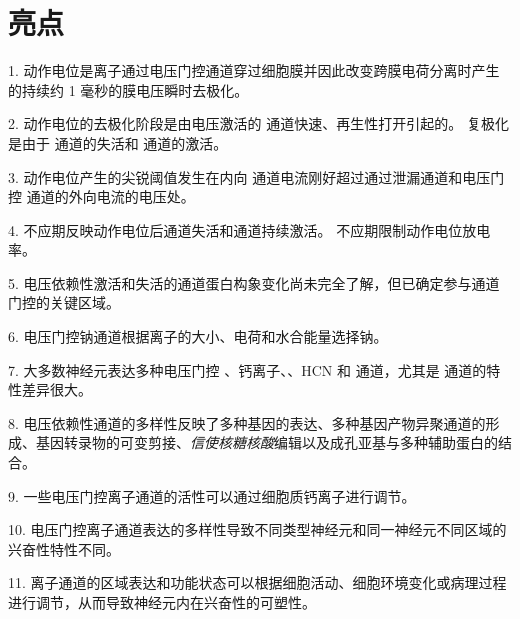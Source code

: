 \section{亮点}

1. 动作电位是离子通过电压门控通道穿过细胞膜并因此改变跨膜电荷分离时产生的持续约 1 毫秒的膜电压瞬时去极化。 


2. 动作电位的去极化阶段是由电压激活的  通道快速、再生性打开引起的。
复极化是由于  通道的失活和  通道的激活。 


3. 动作电位产生的尖锐阈值发生在内向  通道电流刚好超过通过泄漏通道和电压门控  通道的外向电流的电压处。


4. 不应期反映动作电位后通道失活和通道持续激活。
不应期限制动作电位放电率。 


5. 电压依赖性激活和失活的通道蛋白构象变化尚未完全了解，但已确定参与通道门控的关键区域。


6. 电压门控钠通道根据离子的大小、电荷和水合能量选择钠。


7. 大多数神经元表达多种电压门控 、钙离子、、HCN 和  通道，尤其是  通道的特性差异很大。 


8. 电压依赖性通道的多样性反映了多种基因的表达、多种基因产物异聚通道的形成、基因转录物的可变剪接、\textit{信使核糖核酸}编辑以及成孔亚基与多种辅助蛋白的结合。


9. 一些电压门控离子通道的活性可以通过细胞质钙离子进行调节。


10. 电压门控离子通道表达的多样性导致不同类型神经元和同一神经元不同区域的兴奋性特性不同。


11. 离子通道的区域表达和功能状态可以根据细胞活动、细胞环境变化或病理过程进行调节，从而导致神经元内在兴奋性的可塑性。


